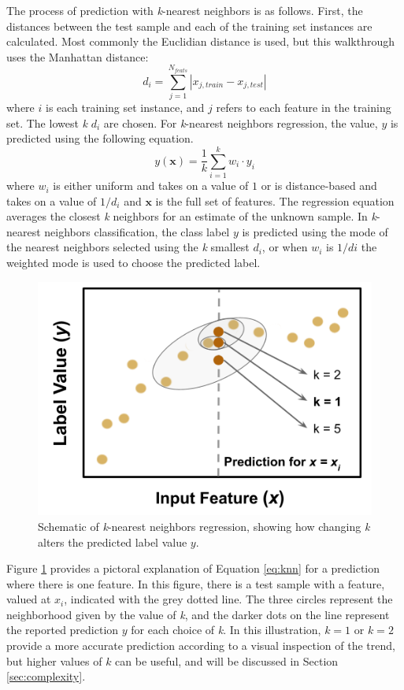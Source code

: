 The process of prediction with \textit{k}-nearest neighbors is as follows.
First, the distances between the test sample and each of the training set
instances are calculated.  Most commonly the Euclidian distance is used, but
this walkthrough uses the Manhattan distance:
\begin{equation}
  d_{i} = \sum_{j=1}^{N_{feats}} |x_{j,train} - x_{j,test}|
  \label{eq:l1}
\end{equation}
where $i$ is each training set instance, and $j$ refers to each feature in the
training set.  The lowest \textit{k} $d_{i}$ are chosen. For \textit{k}-nearest
neighbors regression, the value, $y$ is predicted using the following equation.
\begin{equation}
  y(\boldsymbol{x}) = \frac{1}{k} \sum_{i=1}^{k} w_i \cdot y_i
  \label{eq:knn}
\end{equation}
where $w_{i}$ is either uniform and takes on a value of $1$ or is
distance-based and takes on a value of $1/d_{i}$ and $\boldsymbol{x}$ is the
full set of features. The regression equation averages the closest \textit{k}
neighbors for an estimate of the unknown sample.  In \textit{k}-nearest
neighbors classification, the class label $y$ is predicted using the mode of
the nearest neighbors selected using the \textit{k} smallest $d_i$, or when
$w_i$ is $1/d{i}$ the weighted mode is used to choose the predicted label.

\begin{figure}[!htb]
  \centering
  \includegraphics[width=0.8\linewidth]{./chapters/litrev/nn-fig.png}
  \caption{Schematic of \textit{k}-nearest neighbors regression, showing how 
           changing \textit{k} alters the predicted label value $y$.}
  \label{fig:nn}
\end{figure}

Figure \ref{fig:nn} provides a pictoral explanation of Equation \ref{eq:knn}
for a prediction where there is one feature. In this figure, there is a test
sample with a feature, valued at $x_i$, indicated with the grey dotted line.
The three circles represent the neighborhood given by the value of \textit{k},
and the darker dots on the line represent the reported prediction $y$ for each
choice of \textit{k}.  In this illustration, $k=1$ or $k=2$ provide a more
accurate prediction according to a visual inspection of the trend, but higher
values of $k$ can be useful, and will be discussed in Section
\ref{sec:complexity}.

